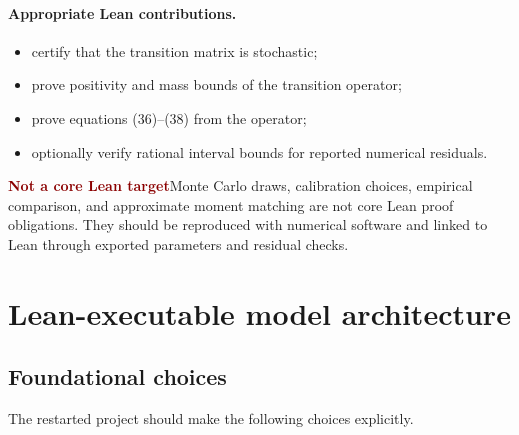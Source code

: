 \documentclass[11pt]{article}
\newcommand{\outside}{\textcolor{darkRed}{\textbf{Not a core Lean target}}}
\newcommand{\statusbox}[2]{\vspace{2pt}\noindent\colorbox{#1}{\parbox{0.955\linewidth}{\small #2}}\vspace{2pt}}
\begin{document}
\paragraph{Appropriate Lean contributions.}
\begin{itemize}
\item certify that the transition matrix is stochastic;
\item prove positivity and mass bounds of the transition operator;
\item prove equations (36)--(38) from the operator;
\item optionally verify rational interval bounds for reported numerical residuals.
\end{itemize}

\statusbox{paleRed}{\outside\quad Monte Carlo draws, calibration choices, empirical comparison, and approximate moment matching are not core Lean proof obligations. They should be reproduced with numerical software and linked to Lean through exported parameters and residual checks.}

\newpage
\section{Lean-executable model architecture}

\subsection{Foundational choices}

The restarted project should make the following choices explicitly.
\end{document}
